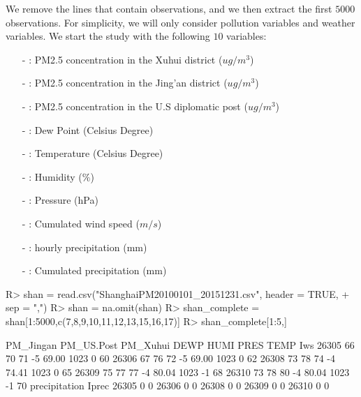 We remove the lines that contain  observations, and we then extract the first $5000$ observations. For simplicity, we will only consider pollution variables and weather variables. We start the study with the following $10$ variables:
\begin{itemize}
\item[-] : PM2.5 concentration in the Xuhui district ($ug/m^{3}$)
\item[-] : PM2.5 concentration in the Jing'an district ($ug/m^{3}$)
\item[-] : PM2.5 concentration in the U.S diplomatic post ($ug/m^{3}$)
\item[-] : Dew Point (Celsius Degree)
\item[-] : Temperature (Celsius Degree)
\item[-] : Humidity ($\%$)
\item[-] : Pressure (hPa)
\item[-] : Cumulated wind speed ($m/s$)
\item[-] : hourly precipitation (mm)
\item[-] : Cumulated precipitation (mm)
\end{itemize}
\begin{Schunk}
\begin{Sinput}
R> shan = read.csv("ShanghaiPM20100101_20151231.csv", header = TRUE, 
+  	sep = ",")
R> shan = na.omit(shan)
R> shan_complete = shan[1:5000,c(7,8,9,10,11,12,13,15,16,17)]
R> shan_complete[1:5,]
\end{Sinput}
\begin{Soutput}
      PM_Jingan PM_US.Post PM_Xuhui DEWP  HUMI PRES TEMP Iws
26305        66         70       71   -5 69.00 1023    0  60
26306        67         76       72   -5 69.00 1023    0  62
26308        73         78       74   -4 74.41 1023    0  65
26309        75         77       77   -4 80.04 1023   -1  68
26310        73         78       80   -4 80.04 1023   -1  70
      precipitation Iprec
26305             0     0
26306             0     0
26308             0     0
26309             0     0
26310             0     0
\end{Soutput}
\end{Schunk}


